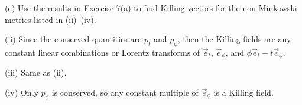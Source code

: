\documentclass[gr-notes.tex]{subfiles}
\begin{document}
(e) Use the results in Exercise 7(a) to find Killing vectors for the non-Minkowski metrics listed in (ii)--(iv).

(ii) Since the conserved quantities are $p_t$ and $p_\phi$, then the Killing fields are any constant linear combinations or Lorentz transforms of $\vec{e}_t$, $\vec{e}_\phi$, and $\phi \vec{e}_t - t \vec{e}_\phi$.

(iii) Same as (ii).

(iv) Only $p_\phi$ is conserved, so any constant multiple of $\vec{e}_\phi$ is a Killing field.
\end{document}
